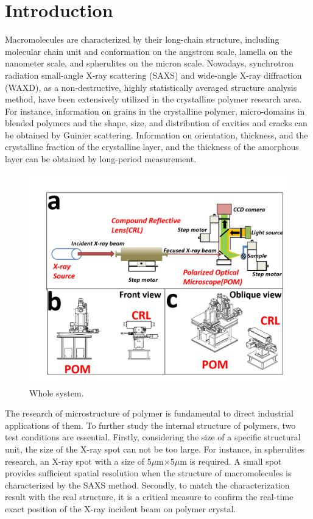 \documentclass{Head}
\begin{document}
\section{Introduction}
Macromolecules are characterized by their long-chain structure, including molecular chain unit and conformation on the angstrom scale, lamella on the nanometer scale, and spherulites on the micron scale.
Nowadays, synchrotron radiation small-angle X-ray scattering (SAXS) and wide-angle X-ray diffraction (WAXD), as a non-destructive, highly statistically averaged structure analysis method, have been extensively utilized in the crystalline polymer research area.
For instance, information on grains in the crystalline polymer, micro-domains in blended polymers and the shape, size, and distribution of cavities and cracks can be obtained by Guinier scattering.
Information on orientation, thickness, and the crystalline fraction of the crystalline layer, and the thickness of the amorphous layer can be obtained by long-period measurement.
\begin{figure}
    \centering
    \includegraphics[scale=0.5]{Figures/Fig1WholeSystem.png}
    \caption{Whole system.}
    \label{WholeSystem}
\end{figure}

The research of microstructure of polymer is fundamental to direct industrial applications of them.
To further study the internal structure of polymers, two test conditions are essential.
Firstly, considering the size of a specific structural unit, the size of the X-ray spot can not be too large.
For instance, in spherulites research, an X-ray spot with a size of 5$\mu$m$\times$5$\mu$m is required.
A small spot provides sufficient spatial resolution when the structure of macromolecules is characterized by the SAXS method.
Secondly, to match the characterization result with the real structure, it is a critical measure to confirm the real-time exact position of the X-ray incident beam on polymer crystal.
\end{document}
